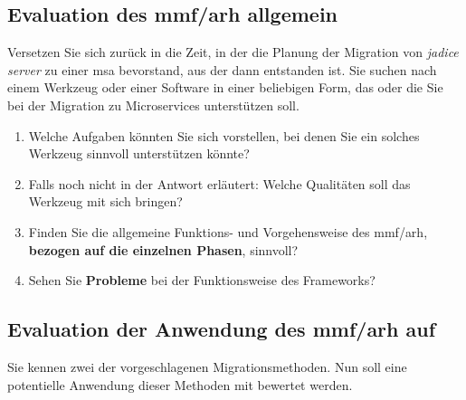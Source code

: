 \subsection{Evaluation des \gls{mmf}/\gls{arh} all\-ge\-mein}

Versetzen Sie sich zurück in die Zeit, in der die Planung der Migration von \emph{jadice server} zu einer \acrlong{msa} bevorstand, aus der dann \jf entstanden ist.
Sie suchen nach einem Werkzeug oder einer Software in einer beliebigen Form, das oder die Sie bei der Migration zu Microservices unterstützen soll.

\begin{enumerate}
	\item Welche Aufgaben könnten Sie sich vorstellen, bei denen Sie ein solches Werkzeug sinnvoll unterstützen könnte?
	\item Falls noch nicht in der Antwort erläutert: Welche Qualitäten soll das Werkzeug mit sich bringen?
	\item Finden Sie die allgemeine Funktions- und Vorgehensweise des \gls{mmf}/\gls{arh}, \textbf{bezogen auf die einzelnen Phasen}, sinnvoll? 
	\item Sehen Sie \textbf{Probleme} bei der Funktionsweise des Frameworks?
\end{enumerate}

\subsection{Evaluation der Anwendung des \gls{mmf}/\gls{arh} auf \jf}

Sie kennen zwei der vorgeschlagenen Migrationsmethoden.
Nun soll eine potentielle Anwendung dieser Methoden mit \jf bewertet werden.

